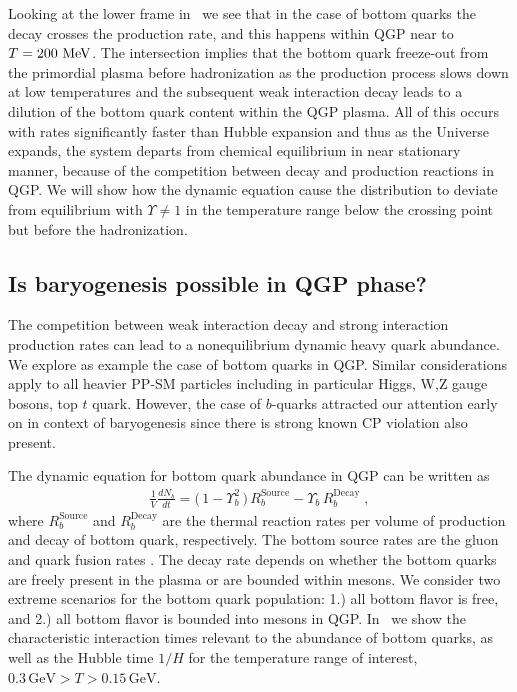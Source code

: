 Looking at the lower frame in~ we see that  in the case of bottom quarks the decay crosses the production rate, and this happens within QGP near to $T=200\text{ MeV}$. The intersection implies that the bottom quark freeze-out from the primordial plasma before hadronization as the production process slows down at low temperatures and the subsequent weak interaction decay leads to a dilution of the bottom quark content within the QGP plasma. All of this occurs with rates significantly faster than Hubble expansion and thus as the Universe expands, the system departs from  chemical equilibrium in near stationary manner, because of the competition between decay and production reactions in QGP. We will show how the dynamic equation cause  the distribution to deviate from equilibrium with $\Upsilon\neq1$ in the temperature range below the crossing point but before the hadronization. 

\subsection{Is baryogenesis possible in QGP phase?}\label{Bottom}
The competition between weak interaction decay and strong interaction production rates can lead to a nonequilibrium dynamic heavy quark abundance. We explore as example the case of bottom quarks in QGP. Similar considerations apply to all heavier PP-SM particles including in particular Higgs, W,Z gauge bosons, top $t$ quark. However, the case of $b$-quarks attracted our attention early on in context of baryogenesis since there is strong known CP violation also present.
 
The dynamic equation for bottom quark abundance in QGP can be written as 
\begin{align}
\label{Bquark_eq}
\frac{1}{V}\frac{dN_b}{dt}=\big(\,1-\Upsilon^2_{b}\,\big)\,R^{\mathrm{Source}}_{b}-\Upsilon_b\,R^{\mathrm{Decay}}_{b}\;,
\end{align}
where $R^{\mathrm{Source}}_{b}$ and $R^{\mathrm{Decay}}_{b}$ are the thermal reaction rates per volume of production and decay of bottom quark, respectively. The bottom source rates are the gluon and quark fusion rates . The decay rate depends on whether the bottom quarks are freely present in the plasma or are bounded within mesons. We consider two extreme scenarios for the bottom quark population: 1.) all bottom flavor is free, and 2.) all bottom flavor is bounded into mesons in QGP. In~ we show the characteristic interaction times relevant to the abundance of bottom quarks, as well as the Hubble time $1/H$ for the temperature range of interest, $0.3\,\mathrm{GeV}> T> 0.15\,\mathrm{GeV}$.

